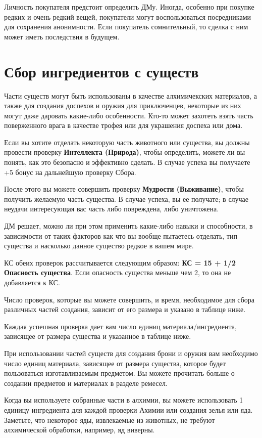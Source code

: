 \documentclass[a4paper, 9pt, twocolumn]{book}
\begin{document}
	Личность покупателя предстоит определить ДМу. Иногда, особенно при покупке редких и очень редкий вещей, покупатели могут воспользоваться посредниками для сохранения анонимности. Если покупатель сомнительный, то сделка с ним может иметь последствия в будущем.
	
	\section{Сбор ингредиентов с существ}
	
	Части существ могут быть использованы в качестве алхимичекских материалов, а также для создания доспехов и оружия для приключенцев, некоторые из них могут даже даровать какие-либо особенности. Кто-то может захотеть взять часть поверженного врага в качестве трофея или для украшения доспеха или дома.
	
	Если вы хотите отделать некоторую часть животного или существа, вы должны провести проверку \textbf{Интеллекта (Природа)}, чтобы определить, можете ли вы понять, как это безопасно и эффективно сделать. В случае успеха вы получаете +5 бонус на дальнейшую проверку Сбора.
	
	После этого вы можете совершить проверку \textbf{Мудрости (Выживание)}, чтобы получить желаемую часть существа. В случае успеха, вы ее получате; в случае неудачи интересующая вас часть либо повреждена, либо уничтожена.
	
	ДМ решает, можно ли при этом применить какие-либо навыки и способности, в зависимости от таких факторов как что вы вообще пытаетесь отделать, тип существа и насколько данное существо редкое в вашем мире.
	
	КС обеих проверок рассчитывается следующим образом: \textbf{КС = 15 + 1/2 Опасность существа}. Если опасность существа меньше чем 2, то она не добавляется к КС.
	
	Число проверок, которые вы можете совершить, и время, необходимое для сбора различных частей создания, зависит от его размера и указано в таблице ниже.
	
	Каждая успешная проверка дает вам число единиц материала/ингредиента, зависящее от размера существа и указанное в таблице ниже.
	
	При использовании частей существ для создания брони и оружия вам необходимо число единиц материала, зависящее от размера существа, которое будет пользоваться изготавливаемым предметом. Вы можете прочитать больше о создании предметов и материалах в разделе ремесел.
	
	Когда вы используете собранные части в алхимии, вы можете использовать 1 единицу ингредиента для каждой проверки Ахимии или создания зелья или яда. Заметьте, что некоторое яды, извлекаемые из животных, не требуют алхимической обработки, например, яд виверны.
	
\end{document}
